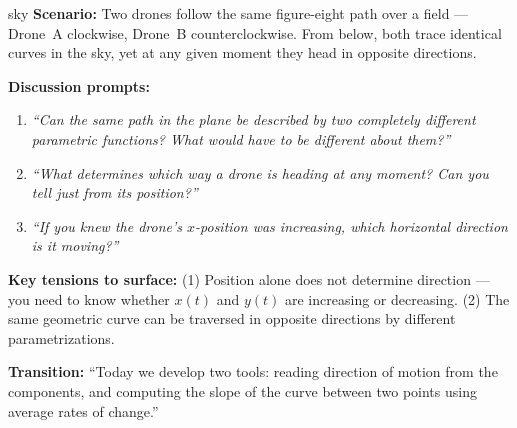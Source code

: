 \documentclass[10pt]{article}
\begin{document}
\vspace{0.08in}

\begin{skillbox}{sky}
\textbf{Scenario:} Two drones follow the same figure-eight path over a
field --- Drone~A clockwise, Drone~B counterclockwise. From below, both
trace identical curves in the sky, yet at any given moment they head in
opposite directions.

\textbf{Discussion prompts:}
\begin{enumerate}[leftmargin=1.4em, itemsep=3pt]
  \item \textit{``Can the same path in the plane be described by two
    completely different parametric functions? What would have to be
    different about them?''}
  \item \textit{``What determines which way a drone is heading at any
    moment? Can you tell just from its position?''}
  \item \textit{``If you knew the drone's $x$-position was increasing,
    which horizontal direction is it moving?''}
\end{enumerate}

\textbf{Key tensions to surface:} (1) Position alone does not determine
direction --- you need to know whether $x(t)$ and $y(t)$ are increasing
or decreasing. (2) The same geometric curve can be traversed in
opposite directions by different parametrizations.

\textbf{Transition:} ``Today we develop two tools: reading direction of
motion from the components, and computing the slope of the curve between
two points using average rates of change.''
\end{skillbox}

\vspace{0.08in}
\end{document}
